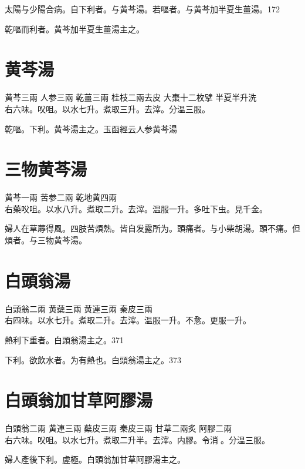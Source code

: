 太陽与少陽合病。自下利者。与黄芩湯。若嘔者。与黄芩加半夏生薑湯。172

乾嘔而利者。黄芩加半夏生薑湯主之。

\section{黄芩湯}

黄芩{\scriptsize 三兩} 人参{\scriptsize 三兩} 乾薑{\scriptsize 三兩} 桂枝{\scriptsize 二兩去皮} 大棗{\scriptsize 十二枚擘} 半夏{\scriptsize 半升洗}\\
右六味。㕮咀。以水七升。煮取三升。去滓。分温三服。

乾嘔。下利。黄芩湯主之。{\scriptsize 玉函經云人参黄芩湯}

\section{三物黄芩湯}

黄芩{\scriptsize 一兩} 苦参{\scriptsize 二兩} 乾地黄{\scriptsize 四兩}\\
右藥㕮咀。以水八升。煮取二升。去滓。温服一升。多吐下虫。{\scriptsize 見千金。}

婦人在草蓐得風。四肢苦煩熱。皆自发露所为。頭痛者。与小柴胡湯。頭不痛。但煩者。与三物黄芩湯。

\section{白頭翁湯}

白頭翁{\scriptsize 二兩} 黄蘗{\scriptsize 三兩} 黄連{\scriptsize 三兩} 秦皮{\scriptsize 三兩}\\
右四味。以水七升。煮取二升。去滓。温服一升。不愈。更服一升。

熱利下重者。白頭翁湯主之。371

下利。欲飲水者。为有熱也。白頭翁湯主之。373

\section{白頭翁加甘草阿膠湯}

白頭翁{\scriptsize 二兩} 黄連{\scriptsize 三兩} 蘗皮{\scriptsize 三兩} 秦皮{\scriptsize 三兩} 甘草{\scriptsize 二兩炙} 阿膠{\scriptsize 二兩}\\
右六味。㕮咀。以水七升。煮取二升半。去滓。内膠。令消{\sungtpii 𥁞}。分温三服。

{\khaaitp 婦人}產後下利。虗極。白頭翁加甘草阿膠湯主之。

